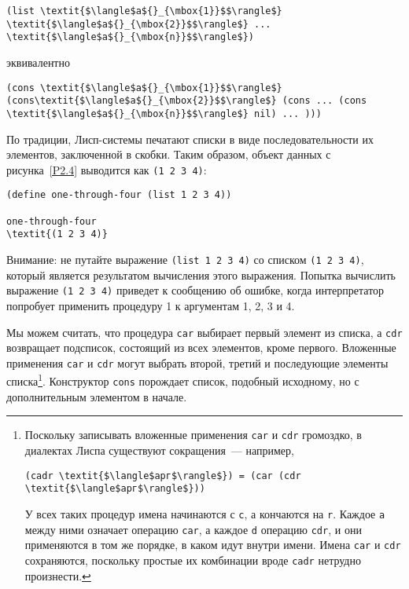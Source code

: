 \begin{Verbatim}[fontsize=\small]
(list \textit{$\langle$a${}_{\mbox{1}}$$\rangle$} \textit{$\langle$a${}_{\mbox{2}}$$\rangle$} ... \textit{$\langle$a${}_{\mbox{n}}$$\rangle$})
\end{Verbatim}
эквивалентно

\begin{Verbatim}[fontsize=\small]
(cons \textit{$\langle$a${}_{\mbox{1}}$$\rangle$} (cons\textit{$\langle$a${}_{\mbox{2}}$$\rangle$} (cons ... (cons \textit{$\langle$a${}_{\mbox{n}}$$\rangle$} nil) ... )))
\end{Verbatim}
По традиции, Лисп-системы  печатают списки в виде последовательности их 
элементов, заключенной в скобки.  Таким образом, объект данных с
рисунка~\ref{P2.4} выводится как {\tt (1 2 3
4)}:

\begin{Verbatim}[fontsize=\small]
(define one-through-four (list 1 2 3 4))

one-through-four
\textit{(1 2 3 4)}
\end{Verbatim}
Внимание: не путайте выражение {\tt (list 1 2 3 4)} со
списком {\tt (1 2 3 4)}, который является результатом
вычисления этого выражения.  Попытка вычислить
выражение {\tt (1 2 3 4)} приведет к сообщению об ошибке, когда 
интерпретатор попробует применить процедуру 1 к аргументам 1, 2, 3 и
4.

Мы можем считать, что процедура {\tt car} выбирает
первый элемент из списка, а {\tt cdr} возвращает подсписок,
состоящий из всех элементов, кроме первого. Вложенные применения
{\tt car} и {\tt cdr} могут выбрать второй, третий и
последующие элементы списка\footnote{Поскольку записывать
вложенные применения 
{\tt car} и {\tt cdr} громоздко, в диалектах Лиспа
существуют сокращения~--- например,

\begin{Verbatim}[fontsize=\footnotesize]
(cadr \textit{$\langle$арг$\rangle$}) = (car (cdr \textit{$\langle$арг$\rangle$}))
\end{Verbatim}
У всех таких процедур имена начинаются с {\tt c}, а кончаются
на {\tt r}.  
Каждое {\tt a} между ними означает операцию 
{\tt car}, а каждое {\tt d} операцию {\tt cdr}, и 
они применяются в том же порядке, в каком идут внутри имени.  Имена
{\tt car} и {\tt cdr} сохраняются, поскольку простые их
комбинации вроде {\tt cadr} 
нетрудно произнести.}.
Конструктор {\tt cons} порождает список, подобный исходному, но с
дополнительным элементом в начале.

